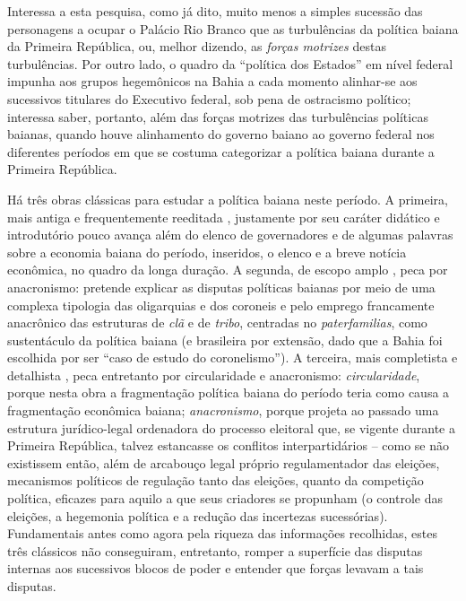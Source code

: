 Interessa a esta pesquisa, como já dito, muito menos a simples sucessão das personagens a ocupar o Palácio Rio Branco que as turbulências da política baiana da Primeira República, ou, melhor dizendo, as \textit{forças motrizes} destas turbulências. Por outro lado, o quadro da ``política dos Estados'' em nível federal impunha aos grupos hegemônicos na Bahia a cada momento alinhar-se aos sucessivos titulares do Executivo federal, sob pena de ostracismo político; interessa saber, portanto, além das forças motrizes das turbulências políticas baianas, quando houve alinhamento do governo baiano ao governo federal nos diferentes períodos em que se costuma categorizar a política baiana durante a Primeira República.

Há três obras clássicas para estudar a política baiana neste período. A primeira, mais antiga e frequentemente reeditada \cite{TAVARES2008}, justamente por seu caráter didático e introdutório pouco avança além do elenco de governadores e de algumas palavras sobre a economia baiana do período, inseridos, o elenco e a breve notícia econômica, no quadro da longa duração. A segunda, de escopo amplo \cite{pang_coronelismo_1979}, peca por anacronismo: pretende explicar as disputas políticas baianas por meio de uma complexa tipologia das oligarquias e dos coroneis e pelo emprego francamente anacrônico das estruturas de \textit{clã} e de \textit{tribo}, centradas no \textit{paterfamilias}, como sustentáculo da política baiana (e brasileira por extensão, dado que a Bahia foi escolhida por ser ``caso de estudo do coronelismo''). A terceira, mais completista e detalhista \cite{sampaio_partidos_1978}, peca entretanto por circularidade e anacronismo: \textit{circularidade}, porque nesta obra a fragmentação política baiana do período teria como causa a fragmentação econômica baiana; \textit{anacronismo}, porque projeta ao passado uma estrutura jurídico-legal ordenadora do processo eleitoral que, se vigente durante a Primeira República, talvez estancasse os conflitos interpartidários -- como se não existissem então, além de arcabouço legal próprio regulamentador das eleições, mecanismos políticos de regulação tanto das eleições, quanto da competição política, eficazes para aquilo a que seus criadores se propunham (o controle das eleições, a hegemonia política e a redução das incertezas sucessórias). Fundamentais antes como agora pela riqueza das informações recolhidas, estes três clássicos não conseguiram, entretanto, romper a superfície das disputas internas aos sucessivos blocos de poder e entender que forças levavam a tais disputas. 

